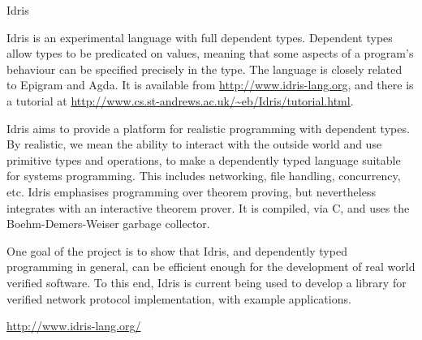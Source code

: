 \documentclass{scrreprt}
\begin{document}
\begin{hcarentry}{Idris}
\makeheader

Idris is an experimental language with full dependent types.
Dependent types allow types to be predicated on values, meaning that
some aspects of a program's behaviour can be specified precisely in
the type. The language is closely related to Epigram and Agda.
It is available from \url{http://www.idris-lang.org}, and there is a
tutorial at \url{http://www.cs.st-andrews.ac.uk/~eb/Idris/tutorial.html}.

Idris aims to provide a platform for realistic programming with
dependent types. By realistic, we mean the ability to interact with
the outside world and use primitive types and operations, to make a
dependently typed language suitable for systems programming. This
includes networking, file handling, concurrency, etc.
Idris emphasises programming over theorem proving, but nevertheless
integrates with an interactive theorem prover. It is compiled, via C,
and uses the Boehm-Demers-Weiser garbage collector.

One goal of the project is to show that Idris, and dependently typed
programming in general, can be efficient enough for the development of
real world verified software. To this end, Idris is current being used
to develop a library for verified network protocol implementation,
with example applications.

\FurtherReading
  \url{http://www.idris-lang.org/}
\end{hcarentry}
\end{document}
